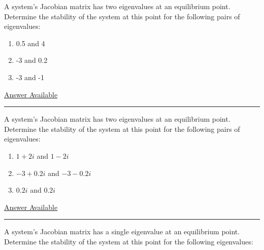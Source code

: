 \documentclass[]{memoir}
\begin{document}

A system's Jacobian matrix has two eigenvalues at an equilibrium point.
Determine the stability of the system at this point for the following
pairs of eigenvalues:

\begin{enumerate}
\def\labelenumi{\arabic{enumi}.}
\itemsep1pt\parskip0pt
\item
  0.5 and 4
\item
  -3 and 0.2
\item
  -3 and -1
\end{enumerate}

\hyperref[Ans-11-16]{Answer Available}

\begin{center}\rule{3in}{0.4pt}\end{center}


A system's Jacobian matrix has two eigenvalues at an equilibrium point.
Determine the stability of the system at this point for the following
pairs of eigenvalues:

\begin{enumerate}
\def\labelenumi{\arabic{enumi}.}
\itemsep1pt\parskip0pt
\item
  $1+2i$ and $1-2i$
\item
  $-3+0.2i$ and $-3-0.2i$
\item
  $0.2i$ and $0.2i$
\end{enumerate}

\hyperref[Ans-11-17]{Answer Available}

\begin{center}\rule{3in}{0.4pt}\end{center}


A system's Jacobian matrix has a single eigenvalue at an equilibrium
point. Determine the stability of the system at this point for the
following eigenvalues:
\end{document}
